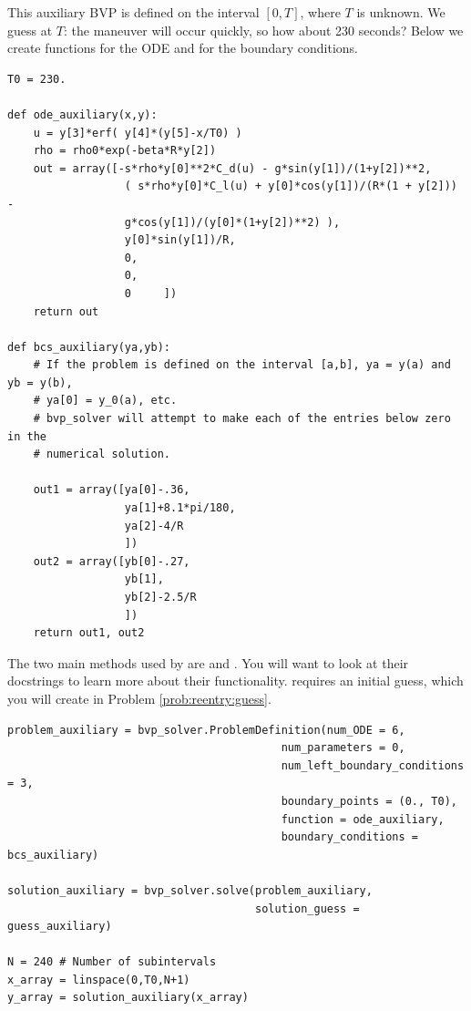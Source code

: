 This auxiliary BVP is defined on the interval $[0,T]$, where $T$ is unknown. 
We guess at $T$: the maneuver will occur quickly, so how about 230 seconds?
Below we create functions for the ODE and for the boundary conditions. 
\begin{lstlisting}
T0 = 230.

def ode_auxiliary(x,y):
	u = y[3]*erf( y[4]*(y[5]-x/T0) )
	rho = rho0*exp(-beta*R*y[2])
	out = array([-s*rho*y[0]**2*C_d(u) - g*sin(y[1])/(1+y[2])**2,
				  ( s*rho*y[0]*C_l(u) + y[0]*cos(y[1])/(R*(1 + y[2])) - 
				  g*cos(y[1])/(y[0]*(1+y[2])**2) ),
				  y[0]*sin(y[1])/R,
				  0,
				  0,
				  0		])
	return out
	
def bcs_auxiliary(ya,yb):
	# If the problem is defined on the interval [a,b], ya = y(a) and yb = y(b), 
	# ya[0] = y_0(a), etc.
	# bvp_solver will attempt to make each of the entries below zero in the 
	# numerical solution.
	
	out1 = array([ya[0]-.36,
				  ya[1]+8.1*pi/180,
				  ya[2]-4/R
				  ])
	out2 = array([yb[0]-.27,
				  yb[1],
				  yb[2]-2.5/R
				  ])
	return out1, out2
\end{lstlisting}

The two main methods used by  are  and . You will want to look at their docstrings to learn more about their functionality.  requires an initial guess, which you will create in Problem \ref{prob:reentry:guess}.
\begin{lstlisting}
problem_auxiliary = bvp_solver.ProblemDefinition(num_ODE = 6,
										  num_parameters = 0,
										  num_left_boundary_conditions = 3,
										  boundary_points = (0., T0),
										  function = ode_auxiliary,
										  boundary_conditions = bcs_auxiliary)
									
solution_auxiliary = bvp_solver.solve(problem_auxiliary,
									  solution_guess = guess_auxiliary)
								
N = 240 # Number of subintervals
x_array = linspace(0,T0,N+1)
y_array = solution_auxiliary(x_array)
	
\end{lstlisting}

